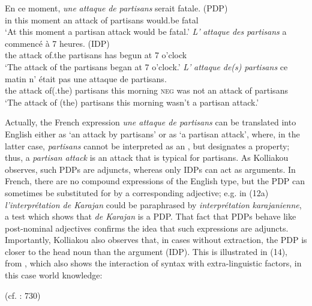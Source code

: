 \documentclass[output=paper]{langsci/langscibook}
\begin{document}
\ea%
    \label{ex:mensch:13}
    \ea
    \gll En ce moment,  \textit{une}  \textit{attaque}  \textit{de}  \textit{partisans}  serait  fatale. (PDP)\\
         in this  moment  an  attack  of  partisans  would.be  fatal\\
    \glt ‘At this moment a partisan attack would be fatal.’
    \ex  
    \gll \textit{L’} \textit{attaque}  \textit{des}  \textit{partisans}  a  commencé  à {7 heures}. (IDP)\\
         the attack  of.the  partisans  has  begun    at {7 o’clock}\\
    \glt ‘The attack of the partisans began at 7 o’clock.’
    \ex  
    \gll \textit{L’}  \textit{attaque}  \textit{de(s)}   \textit{partisans}  ce  matin    n’ était    pas       une  attaque  de  partisans.\\
         the  attack    of(.the) partisans  this  morning  \textsc{neg} was  not    an  attack    of  partisans\\
    \glt ‘The attack of (the) partisans this morning wasn’t a partisan attack.’
    \z
\z

Actually, the French expression \textit{une attaque de partisans} can be translated into English either as ‘an attack by partisans’ or as ‘a partisan attack’, where, in the latter case, \textit{partisans} cannot be interpreted as an \AGENT, but designates a property; thus, a \textit{partisan attack} is an attack that is typical for partisans. As Kolliakou observes, such PDPs are adjuncts, whereas only IDPs can act as arguments. In French, there are no compound expressions of the English type, but the PDP can sometimes be substituted for by a corresponding adjective; e.g. in (12a) \textit{l’interprétation de Karajan} could be paraphrased by \textit{interprétation} \textit{karajanienne}, a test which shows that \textit{de Karajan} is a PDP. That fact that PDPs behave like post-nominal adjectives confirms the idea that such expressions are adjuncts. Importantly, Kolliakou also observes that, in cases without extraction, the PDP is closer to the head noun than the argument (IDP). This is illustrated in (14), from \citet[714]{Kolliakou1999}, which also shows the interaction of syntax with extra-linguistic factors, in this case world knowledge:

\ea%
    \label{ex:mensch:14}
    \glt (cf. \citealt{Kolliakou1999}: 730)
    \z
\z    
\end{document}
